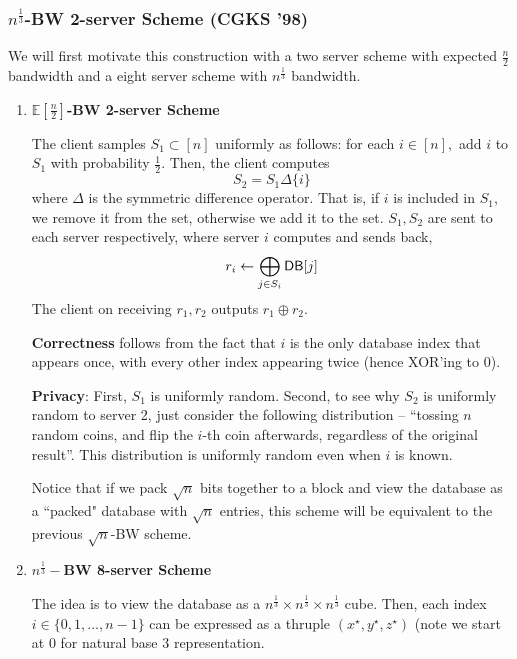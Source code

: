 \subsubsection{$n^{\frac{1}{3}}$-BW 2-server Scheme (CGKS '98)}
We will first motivate this construction with a two server scheme with expected $\frac{n}{2}$ bandwidth and a eight server scheme with $n^{\frac 1 3}$ bandwidth. 
\begin{enumerate}
	\item \textbf{$\mathbb{E}[\frac{n}{2}]$-BW 2-server Scheme}
	
		The client samples $S_{1} \subset [n]$ uniformly as follows: for each $i \in [n],$ add $i$ to $S_{1}$ with probability $\frac{1}{2}$. Then, the client computes
		\[S_{2} = S_{1} \Delta \{i\}\]
		where $\Delta$ is the symmetric difference operator. That is, if $i$ is included in $S_1$, we remove it from the set, otherwise we add it to the set. $S_{1},S_{2}$ are sent to each server respectively, where server $i$ computes and sends back,
		\[r_{i} \leftarrow \bigoplus_{j \in S_{i}} {\sf DB}[j]\]
		The client on receiving $r_1,r_2$ outputs $r_1 \oplus r_2$. 
	
		\textbf{Correctness} follows from the fact that $i$ is the only database index that appears once, with every other index appearing twice (hence XOR'ing to 0).

		\textbf{Privacy}: First, $S_1$ is uniformly random. Second, to see why $S_2$ is uniformly random to server 2, just consider the following distribution -- ``tossing $n$ random coins, and flip the $i$-th coin afterwards, regardless of the original result''. This distribution is uniformly random even when $i$ is known. %
        
        
        Notice that if we pack $\sqrt{n}$ bits together to a block and view the database as a ``packed" database with $\sqrt{n}$ entries, this scheme will be equivalent to the previous $\sqrt{n}$-BW scheme.
	
	\item \textbf{$n^{\frac 1 3}-$BW 8-server Scheme}
	
		The idea is to view the database as a $n^{\frac 1 3} \times n^{\frac 1 3} \times n^{\frac 1 3}$ cube. Then, each index $i \in \{0,1,\dots,n - 1\}$ can be expressed as a thruple $(x^\star, y^\star, z^\star)$ (note we start at $0$ for natural base 3 representation.


\end{enumerate}
